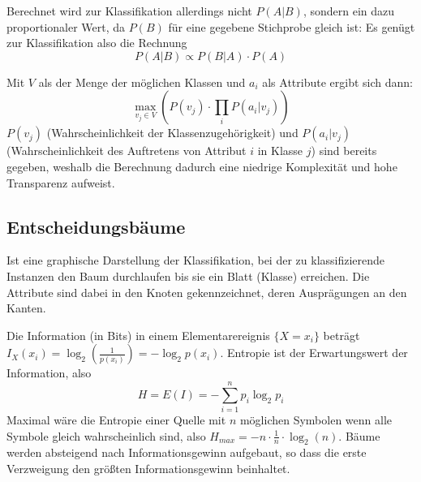 \documentclass{article}
\begin{document}
Berechnet wird zur Klassifikation allerdings nicht $P(A|B)$, sondern ein dazu proportionaler Wert, da $P(B)$ für eine gegebene Stichprobe gleich ist:
Es genügt zur Klassifikation also die Rechnung 
\[ P(A|B)\propto P(B|A) \cdot P(A) \]

Mit $V$ als der Menge der möglichen Klassen und $a_{i}$ als Attribute ergibt sich dann: 
\[ \max_{v_{j}\in V}( P(v_{j}) \cdot \prod_{i} P(a_{i}| v_{j}) ) \]
$P(v_{j})$ (Wahrscheinlichkeit der Klassenzugehörigkeit) und $P(a_{i}|v_{j})$ (Wahrscheinlichkeit des Auftretens von Attribut $i$ in Klasse $j$) sind bereits gegeben,
weshalb die Berechnung dadurch eine niedrige Komplexität und hohe Transparenz aufweist.

\subsection{Entscheidungsbäume}
Ist eine graphische Darstellung der Klassifikation, bei der zu klassifizierende Instanzen den Baum durchlaufen
bis sie ein Blatt (Klasse) erreichen. Die Attribute sind dabei in den Knoten gekennzeichnet, deren Ausprägungen an den Kanten.

Die Information (in Bits) in einem Elementarereignis $ \{X = x_{i} \} $ beträgt $ I_{X}(x_{i}) = \log_{2}(\frac{1}{p(x_{i})}) = - \log_{2}p(x_{i})$.
Entropie ist der Erwartungswert der Information, also
\[ H = E(I) =  -\sum_{i=1}^{n} p_{i} \log_{2}p_{i} \]
Maximal wäre die Entropie einer Quelle mit $n$ möglichen Symbolen wenn alle Symbole gleich wahrscheinlich sind, 
also $H_{max} = -n \cdot \frac{1}{n} \cdot \log_{2}(n)$.
Bäume werden absteigend nach Informationsgewinn aufgebaut, so dass die erste Verzweigung den größten Informationsgewinn beinhaltet.
\end{document}
